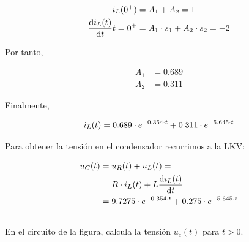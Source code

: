\documentclass[12pt]{article}
\begin{document}
\begin{align*}
  i_L(0^+) &= A_1 + A_2 = 1\\
  \diff{i_L(t)}{t}{t = 0^+} &= A_1 \cdot s_1 + A_2 \cdot s_2 = -2
\end{align*}

Por tanto,

\begin{align*}
  A_1 &= 0.689\\
  A_2 &= 0.311
\end{align*}

Finalmente,

\begin{equation*}
  i_L(t) = 0.689 \cdot e^{-0.354 \cdot t} + 0.311 \cdot e^{-5.645 \cdot t}\\
\end{equation*}

Para obtener la tensión en el condensador recurrimos a la LKV:

\begin{align*}
  u_C(t) &= u_R(t) + u_L(t) = \\
         &= R \cdot i_L(t) + L \diff{i_L(t)}{t} = \\
         &= 9.7275 \cdot e^{-0.354 \cdot t} + 0.275 \cdot e^{-5.645 \cdot t}
\end{align*}

\clearpage

\subsection{}

En el circuito de la figura, calcula la tensión $u_c(t)$ para $t > 0$.

\vspace*{1cm}
\end{document}
